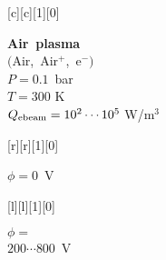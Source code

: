    [c][c][1][0]{
   \begin{minipage}{0.7\textwidth} 
      \centering
       {\bf\boldmath Air~plasma}\\[0.7em]
      $\big($Air,~Air$^+$,~e$^-$$\big)$\\[0.7em]
      $P=0.1$~bar\\[0.7em]
      $T=300$ K\\[0.7em]
      $Q_{\rm ebeam}=10^2 \cdots  10^{5}$ W/m$^{3}$
   \end{minipage}}
   [r][r][1][0]{\begin{minipage}{0.22\textwidth}$\phi=0$~V\end{minipage}}
   [l][l][1][0]{\begin{minipage}{0.25\textwidth}$\phi=$\\$200\cdots800$~V\end{minipage}}

